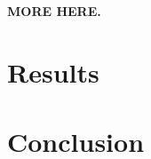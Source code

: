 \documentclass[preprint]{acmconf}
\begin{document}
{\bf MORE HERE.}

\section{Results}
\section{Conclusion}




%
\end{document}
